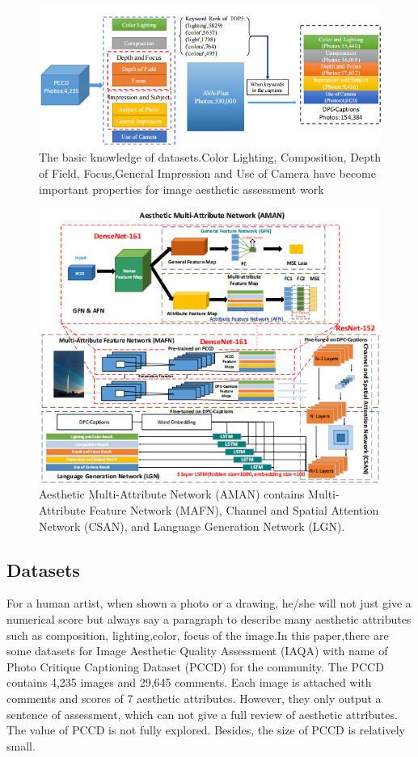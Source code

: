 \documentclass[xelatex,a4j,10pt,twocolumn]{article}
\begin{document}
\begin{figure}[t]
	\centering
    \includegraphics[width=1\textwidth]{9.png}    
 	\caption{The basic knowledge of datasets.Color Lighting, Composition, Depth of Field, Focus,General Impression and Use of Camera have become important properties for image aesthetic assessment work}
 	\label{fig:9}
\end{figure}

\begin{figure}[t]
	\centering
    \includegraphics[width=1\textwidth]{10.png}    
 	\caption{Aesthetic Multi-Attribute Network (AMAN) contains Multi-Attribute Feature Network (MAFN), Channel and Spatial Attention Network (CSAN), and Language Generation Network (LGN).}
 	\label{fig:10}
\end{figure}


\subsection{Datasets}
For a human artist, when shown a photo or a drawing, he/she will not just give a numerical score but always say a paragraph to describe many aesthetic attributes such as composition, lighting,color, focus of the image.In this paper,there are some datasets for Image Aesthetic Quality Assessment (IAQA) with name of Photo Critique Captioning Dataset (PCCD)\cite{7PDD} for the community. The PCCD contains 4,235 images and 29,645 comments. Each image is attached with comments and scores of 7 aesthetic attributes. However, they only output a sentence of assessment, which can not give a full review of aesthetic attributes. The value of PCCD is not fully explored. Besides, the size of PCCD is relatively small.
\end{document}
